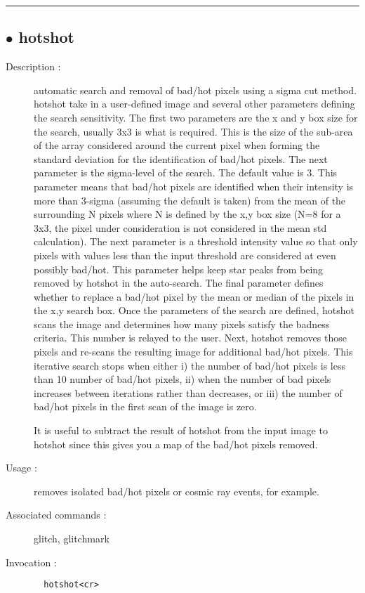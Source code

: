 \hrule \subsection*{$\bullet$ hotshot}
\begin{description}
\item[Description :] automatic search and removal of bad/hot pixels using a sigma
cut method.  hotshot take in a user-defined image and several other
parameters defining the search sensitivity.  The first two parameters are
the x and y box size for the search, usually 3x3 is what is required.
This is the size of the sub-area of the array considered around the
current pixel when forming the standard deviation for the identification
of bad/hot pixels.  The next parameter is the sigma-level of the search.
The default value is 3.  This parameter means that bad/hot pixels are
identified when their intensity is more than 3-sigma (assuming the
default is taken) from the mean of the surrounding N pixels where N is
defined by the x,y box size (N=8 for a 3x3, the pixel under consideration
is not considered in the mean std calculation).  The next parameter is a
threshold intensity value so that only pixels with values less than the
input threshold are considered at even possibly bad/hot.  This parameter
helps keep star peaks from being removed by hotshot in the auto-search.
The final parameter defines whether to replace a bad/hot pixel by the
mean or median of the pixels in the x,y search box.  Once the parameters
of the search are defined, hotshot scans the image and determines how
many pixels satisfy the badness criteria.  This number is relayed to the
user.  Next, hotshot removes those pixels and re-scans the resulting
image for additional bad/hot pixels.  This iterative search stops when
either i) the number of bad/hot pixels is less than 10%
number of bad/hot pixels, ii) when the number of bad pixels increases
between iterations rather than decreases, or iii) the number of bad/hot
pixels in the first scan of the image is zero.

It is useful to subtract the result of hotshot from the input image to
hotshot since this gives you a map of the bad/hot pixels removed.

\item[Usage :] removes isolated bad/hot pixels or cosmic ray events, for
example.
\item[Associated commands :] glitch, glitchmark
\item[Invocation :]

\verb+  hotshot<cr> +\end{description}

